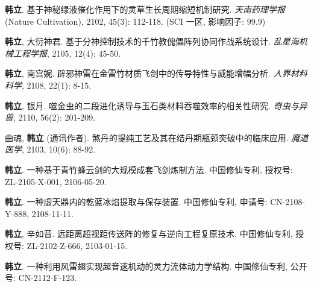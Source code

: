 
\begin{achievements}


\begin{theachievements}[已发表学术论文]
    \item \textbf{韩立}. 基于神秘绿液催化作用下的灵草生长周期缩短机制研究. \textit{天南药理学报} (Nature Cultivation), 2102, 45(3): 112-118. (SCI 一区, 影响因子: 99.9)
    \item \textbf{韩立}, 大衍神君. 基于分神控制技术的千竹教傀儡阵列协同作战系统设计. \textit{乱星海机械工程学报}, 2105, 12(4): 45-50.
    \item \textbf{韩立}, 南宫婉. 辟邪神雷在金雷竹材质飞剑中的传导特性与威能增幅分析. \textit{人界材料科学}, 2108, 22(1): 8-15.
    \item \textbf{韩立}, 银月. 噬金虫的二段进化诱导与玉石类材料吞噬效率的相关性研究. \textit{奇虫与异兽}, 2110, 56(2): 201-209.
    \item 曲魂, \textbf{韩立} (通讯作者). 煞丹的提纯工艺及其在结丹期瓶颈突破中的临床应用. \textit{魔道医学}, 2103, 10(6): 88-92.
\end{theachievements}

\begin{theachievements}[申请及已授权发明专利]
    \item \textbf{韩立}. 一种基于青竹蜂云剑的大规模成套飞剑炼制方法. 中国修仙专利, 授权号: ZL-2105-X-001, 2106-05-20.
    \item \textbf{韩立}. 一种虚天鼎内的乾蓝冰焰提取与保存装置. 中国修仙专利, 申请号: CN-2108-Y-888, 2108-11-11.
    \item \textbf{韩立}, 辛如音. 远距离超视距传送阵的修复与逆向工程复原技术. 中国修仙专利, 授权号: ZL-2102-Z-666, 2103-01-15.
    \item \textbf{韩立}. 一种利用风雷翅实现超音速机动的灵力流体动力学结构. 中国修仙专利, 公开号: CN-2112-F-123.
\end{theachievements}


\end{achievements}
